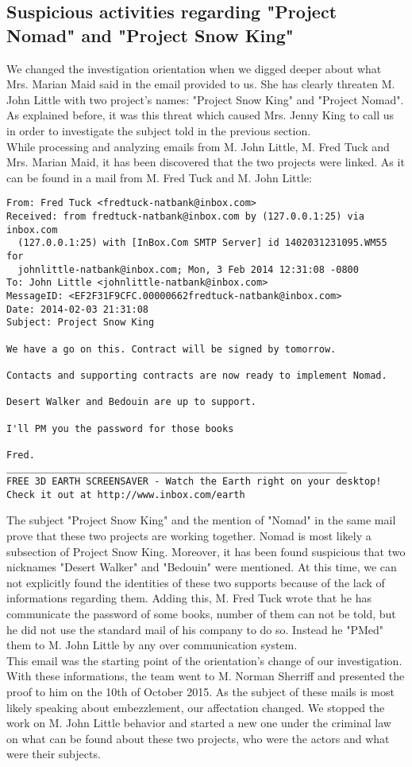 \subsection{Suspicious activities regarding "Project Nomad" and "Project Snow King"}
We changed the investigation orientation when we digged deeper about what Mrs. Marian Maid said in the email provided to us. She has clearly threaten M. John Little with two project's names: "Project Snow King" and "Project Nomad". As explained before, it was this threat which caused Mrs. Jenny King to call us in order to investigate the subject told in the previous section.\\
While processing and analyzing emails from M. John Little, M. Fred Tuck and Mrs. Marian Maid, it has been discovered that the two projects were linked. As it can be found in a mail from M. Fred Tuck and M. John Little:\\
\begin{verbatim}
From: Fred Tuck <fredtuck-natbank@inbox.com>
Received: from fredtuck-natbank@inbox.com by (127.0.0.1:25) via inbox.com
  (127.0.0.1:25) with [InBox.Com SMTP Server] id 1402031231095.WM55 for
  johnlittle-natbank@inbox.com; Mon, 3 Feb 2014 12:31:08 -0800
To: John Little <johnlittle-natbank@inbox.com>
MessageID: <EF2F31F9CFC.00000662fredtuck-natbank@inbox.com>
Date: 2014-02-03 21:31:08
Subject: Project Snow King

We have a go on this. Contract will be signed by tomorrow.

Contacts and supporting contracts are now ready to implement Nomad. 

Desert Walker and Bedouin are up to support.

I'll PM you the password for those books

Fred.
____________________________________________________________
FREE 3D EARTH SCREENSAVER - Watch the Earth right on your desktop!
Check it out at http://www.inbox.com/earth
\end{verbatim}

The subject "Project Snow King" and the mention of "Nomad" in the same mail prove that these two projects are working together. Nomad is most likely a subsection of Project Snow King. Moreover, it has been found suspicious that two nicknames "Desert Walker" and "Bedouin" were mentioned. At this time, we can not explicitly found the identities of these two supports because of the lack of informations regarding them. Adding this, M. Fred Tuck wrote that he has communicate the password of some books, number of them can not be told, but he did not use the standard mail of his company to do so. Instead he "PMed" them to M. John Little by any over communication system.\\
This email was the starting point of the orientation's change of our investigation. With these informations, the team went to M. Norman Sherriff and presented the proof to him on the 10th of October 2015. As the subject of these mails is most likely speaking about embezzlement, our affectation changed. We stopped the work on M. John Little behavior and started a new one under the criminal law on what can be found about these two projects, who were the actors and what were their subjects.

